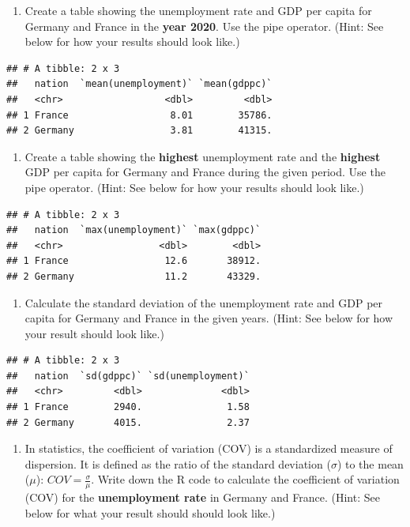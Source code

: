 \documentclass[
  12pt,
  oneside]{book}
\providecommand{\tightlist}{%
  \setlength{\itemsep}{0pt}\setlength{\parskip}{0pt}}
\theoremstyle{definition}
\theoremstyle{definition}
\theoremstyle{definition}
\theoremstyle{definition}
\theoremstyle{remark}
\begin{document}
\begin{enumerate}
\def\labelenumi{(\arabic{enumi})}
\setcounter{enumi}{15}
\tightlist
\item
  Create a table showing the unemployment rate and GDP per capita for Germany
  and France in the \textbf{year 2020}. Use the pipe operator. (Hint: See below for how your results should
  look like.)
\end{enumerate}

\begin{verbatim}
## # A tibble: 2 x 3
##   nation  `mean(unemployment)` `mean(gdppc)`
##   <chr>                  <dbl>         <dbl>
## 1 France                  8.01        35786.
## 2 Germany                 3.81        41315.
\end{verbatim}

\begin{enumerate}
\def\labelenumi{(\arabic{enumi})}
\setcounter{enumi}{16}
\tightlist
\item
  Create a table showing the \textbf{highest} unemployment rate and the \textbf{highest}
  GDP per capita for Germany and France during the given period.
  Use the pipe operator. (Hint: See below for how your results should look like.)
\end{enumerate}

\begin{verbatim}
## # A tibble: 2 x 3
##   nation  `max(unemployment)` `max(gdppc)`
##   <chr>                 <dbl>        <dbl>
## 1 France                 12.6       38912.
## 2 Germany                11.2       43329.
\end{verbatim}

\begin{enumerate}
\def\labelenumi{(\arabic{enumi})}
\setcounter{enumi}{17}
\tightlist
\item
  Calculate the standard deviation of the unemployment rate and GDP per capita for Germany
  and France in the given years. (Hint: See below for how your result should
  look like.)
\end{enumerate}

\begin{verbatim}
## # A tibble: 2 x 3
##   nation  `sd(gdppc)` `sd(unemployment)`
##   <chr>         <dbl>              <dbl>
## 1 France        2940.               1.58
## 2 Germany       4015.               2.37
\end{verbatim}

\begin{enumerate}
\def\labelenumi{(\arabic{enumi})}
\setcounter{enumi}{18}
\tightlist
\item
  In statistics, the coefficient of variation (COV) is a standardized measure of
  dispersion. It is defined as the ratio of the standard deviation (\(\sigma\)) to the mean (\(\mu\)):
  \(COV={\frac {\sigma }{\mu }}\).
  Write down the R code to calculate the coefficient of variation (COV) for the
  \textbf{unemployment rate} in Germany and France. (Hint: See below for what your result should should look like.)
\end{enumerate}
\end{document}
